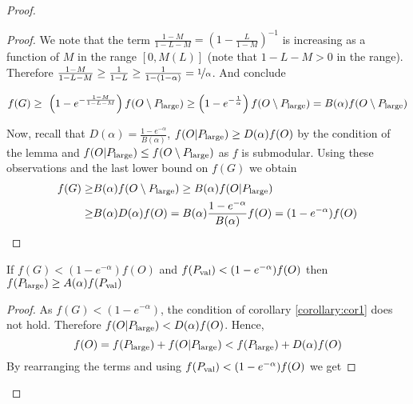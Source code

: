 \begin{proof}
\begin{proof}
  	We note that the term $\frac{1-M}{1-L-M} = \left(  1- \frac{L}{1-M} \right)^{-1}$ is increasing as a function
  	of $M$  in the range $[0, M(L)]$ (note that $1-L-M >0$ in the range).
  	Therefore $\frac{1-M}{1-L-M} \geq  \frac{1 }{1-L}  \geq \frac{1}{1-(1-\alpha)} = \nicefrac[]{1}{\alpha}$. And conclude
  		
  	  $$f(G)
  	\geq \ \left(1-e^{- \frac{1-M }{1-L-M}}\right) f(O\setminus P_{\text{large}}) \geq \left( 1- e ^ {- \frac{1}{ \alpha}} \right)f(O\setminus P_{\text{large}})
  	= B(\alpha)f(O\setminus P_{\text{large}}) $$
  	
  	Now, recall that $D(\alpha)= \frac{1-e^{-\alpha}}{B(\alpha)}$,
	$f(O|P_{\text{large}}) \geq D(\alpha) f(O)$ by the condition of the
	lemma and $f(O|P_{\text{large}}) \leq f(O\setminus P_{\text{large}})$ as
	$f$ is submodular. Using these observations and the last lower
	bound on $f(G)$ we obtain
\begin{align*}
f(G) \geq& B(\alpha)f(O\setminus P_{\text{large}})  \geq
B(\alpha) f(O|P_{\text{large}})\\  \geq&
B(\alpha ) D(\alpha ) f(O)
= B(\alpha)\frac{1-e^{-\alpha}}{B(\alpha) }f(O)= (1-e^{-\alpha})f(O)
\end{align*}

	\end{proof}

	\begin{corollary}
		\label{corollary:cor2}
		If $f(G)< (1-e^{-\alpha})f(O)$ and $f(P_{\text{val}}) < (1-e^{-\alpha})f(O)$ then
		$f(P_{\text{large}}) \geq A(\alpha) f(P_{\text{val}})$
		\end{corollary}
	\begin{proof}
		As $f(G)< (1-e^{-\alpha})$, the condition of corollary \ref{corollary:cor1} does not hold. Therefore
		$f(O|P_{\text{large}})< D(\alpha) f(O)$. Hence,
		$$f(O)= f(P_{\text{large}}) + f(O|P_{\text{large}}) < f(P_{\text{large}}) + D(\alpha) f(O)$$
		By rearranging the terms and using $f(P_{\text{val}}) < (1-e^{-\alpha})f(O)$
		we get


\end{proof}
\end{proof}
